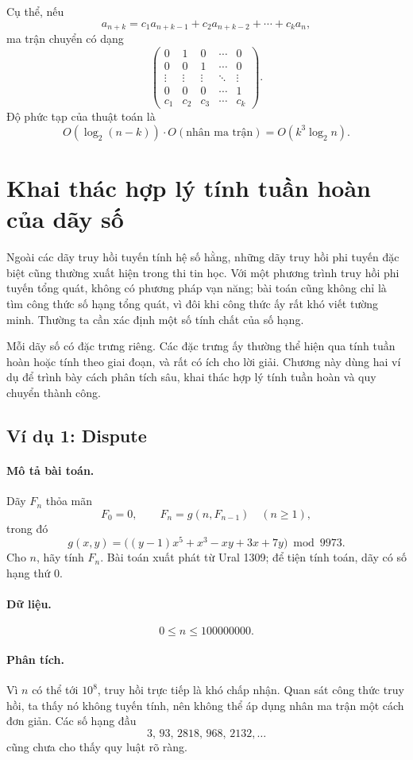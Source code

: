 \documentclass[11pt]{article}
\begin{document}
Cụ thể, nếu
\[
  a_{n+k}=c_1a_{n+k-1}+c_2a_{n+k-2}+\cdots+c_ka_n,
\]
ma trận chuyển có dạng
\[
  \begin{pmatrix}
    0&1&0&\cdots&0\\
    0&0&1&\cdots&0\\
    \vdots&\vdots&\vdots&\ddots&\vdots\\
    0&0&0&\cdots&1\\
    c_1&c_2&c_3&\cdots&c_k
  \end{pmatrix}.
\]
Độ phức tạp của thuật toán là
\[
  O(\log_2(n-k))\cdot O(\text{nhân ma trận})=O(k^3\log_2 n).
\]

\section{Khai thác hợp lý tính tuần hoàn của dãy số}

Ngoài các dãy truy hồi tuyến tính hệ số hằng, những dãy truy hồi phi tuyến đặc
biệt cũng thường xuất hiện trong thi tin học. Với một phương trình truy hồi
phi tuyến tổng quát, không có phương pháp vạn năng; bài toán cũng không chỉ là
tìm công thức số hạng tổng quát, vì đôi khi công thức ấy rất khó viết tường
minh. Thường ta cần xác định một số tính chất của số hạng.

Mỗi dãy số có đặc trưng riêng. Các đặc trưng ấy thường thể hiện qua tính tuần
hoàn hoặc tính theo giai đoạn, và rất có ích cho lời giải. Chương này dùng hai
ví dụ để trình bày cách phân tích sâu, khai thác hợp lý tính tuần hoàn và quy
chuyển thành công.

\subsection{Ví dụ 1: Dispute}

\paragraph{Mô tả bài toán.}
Dãy $F_n$ thỏa mãn
\[
  F_0=0,\qquad F_n=g(n,F_{n-1})\quad(n\ge 1),
\]
trong đó
\[
  g(x,y)=\bigl((y-1)x^5+x^3-xy+3x+7y\bigr)\bmod 9973.
\]
Cho $n$, hãy tính $F_n$. Bài toán xuất phát từ Ural 1309; để tiện tính toán,
dãy có số hạng thứ $0$.

\paragraph{Dữ liệu.}
\[
  0\le n\le 100000000.
\]

\paragraph{Phân tích.}
Vì $n$ có thể tới $10^8$, truy hồi trực tiếp là khó chấp nhận. Quan sát công
thức truy hồi, ta thấy nó không tuyến tính, nên không thể áp dụng nhân ma trận
một cách đơn giản. Các số hạng đầu
\[
  3,\,93,\,2818,\,968,\,2132,\ldots
\]
cũng chưa cho thấy quy luật rõ ràng.
\end{document}
